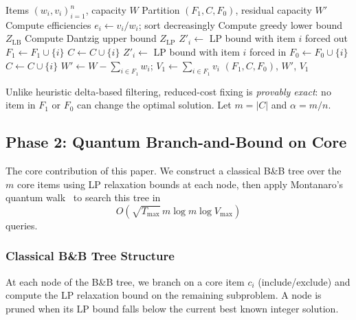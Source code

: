 \documentclass[conference]{IEEEtran} \IEEEoverridecommandlockouts
\begin{document}
\begin{algorithm}[h]
\caption{Reduced-Cost Variable Fixing}
\label{alg:filter}
\begin{algorithmic}[1]
\REQUIRE Items $(w_i, v_i)_{i=1}^n$, capacity $W$
\ENSURE Partition $(F_1, C, F_0)$, residual capacity $W'$
\STATE Compute efficiencies $e_i \leftarrow v_i / w_i$; sort decreasingly
\STATE Compute greedy lower bound $Z_{\text{LB}}$
\STATE Compute Dantzig upper bound $Z_{\text{LP}}$
        \STATE $Z'_i \leftarrow$ LP bound with item $i$ forced out
            \STATE $F_1 \leftarrow F_1 \cup \{i\}$ 
        \ELSE
            \STATE $C \leftarrow C \cup \{i\}$
        \ENDIF
    \ELSE
        \STATE $Z'_i \leftarrow$ LP bound with item $i$ forced in
            \STATE $F_0 \leftarrow F_0 \cup \{i\}$ 
        \ELSE
            \STATE $C \leftarrow C \cup \{i\}$
        \ENDIF
    \ENDIF
\ENDFOR
\STATE $W' \leftarrow W - \sum_{i \in F_1} w_i$; $V_1 \leftarrow \sum_{i \in F_1} v_i$
\RETURN $(F_1, C, F_0)$, $W'$, $V_1$
\end{algorithmic}
\end{algorithm}

Unlike heuristic delta-based filtering, reduced-cost fixing is \textit{provably exact}: no item in $F_1$ or $F_0$ can change the optimal solution. Let $m = |C|$ and $\alpha = m/n$.

\subsection{Phase 2: Quantum Branch-and-Bound on Core}

The core contribution of this paper. We construct a classical B\&B tree over the $m$ core items using LP relaxation bounds at each node, then apply Montanaro's quantum walk~\cite{ref24} to search this tree in $$O\!\left(\sqrt{T_{\max}}\,m\log m\log V_{\max}\right)$$ queries.

\subsubsection{Classical B\&B Tree Structure}

At each node of the B\&B tree, we branch on a core item $c_i$ (include/exclude) and compute the LP relaxation bound on the remaining subproblem. A node is pruned when its LP bound falls below the current best known integer solution.
\end{document}
